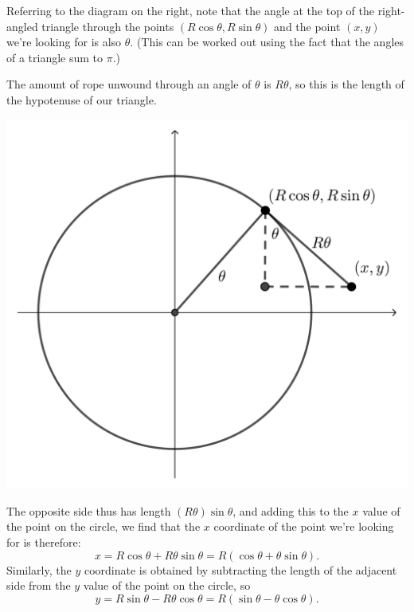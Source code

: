 \documentclass[12pt]{article}
\begin{document}
\begin{multicols}{2}
Referring to the diagram on the right, note that the angle at the top of the right-angled triangle through the points $(R\cos\theta,R\sin\theta)$ and the point $(x,y)$ we're looking for is also $\theta$. (This can be worked out using the fact that the angles of a triangle sum to $\pi$.)

The amount of rope unwound through an angle of $\theta$ is $R\theta$, so this is the length of the hypotenuse of our triangle.

\columnbreak

\begin{center}
\includegraphics[width=\columnwidth]{cow-silo2}
\end{center}
\end{multicols}

The opposite side thus has length $(R\theta)\sin\theta$, and adding this to the $x$ value of the point on the circle, we find that the $x$ coordinate of the point we're looking for is therefore:
\[
x= R\cos\theta+R\theta\sin\theta=R(\cos\theta+\theta\sin\theta).
\]
Similarly, the $y$ coordinate is obtained by subtracting the length of the adjacent side from the $y$ value of the point on the circle, so
\[
y=R\sin\theta-R\theta\cos\theta = R(\sin\theta-\theta\cos\theta).
\]
\end{document}
